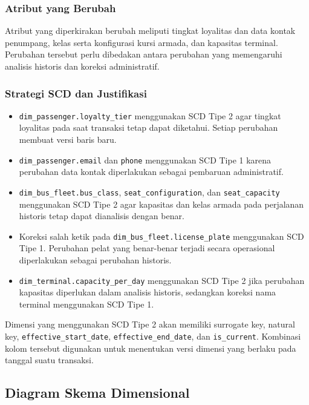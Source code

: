 \subsubsection{Atribut yang Berubah}

Atribut yang diperkirakan berubah meliputi tingkat loyalitas dan data kontak
penumpang, kelas serta konfigurasi kursi armada, dan kapasitas terminal. Perubahan
tersebut perlu dibedakan antara perubahan yang memengaruhi analisis historis dan
koreksi administratif.

\subsubsection{Strategi SCD dan Justifikasi}

\begin{itemize}[leftmargin=*, topsep=0pt]
    \item \texttt{dim\_passenger.loyalty\_tier} menggunakan SCD Tipe 2 agar tingkat
    loyalitas pada saat transaksi tetap dapat diketahui. Setiap perubahan membuat
    versi baris baru.
    \item \texttt{dim\_passenger.email} dan \texttt{phone} menggunakan SCD Tipe 1
    karena perubahan data kontak diperlakukan sebagai pembaruan administratif.
    \item \texttt{dim\_bus\_fleet.bus\_class}, \texttt{seat\_configuration}, dan
    \texttt{seat\_capacity} menggunakan SCD Tipe 2 agar kapasitas dan kelas armada
    pada perjalanan historis tetap dapat dianalisis dengan benar.
    \item Koreksi salah ketik pada \texttt{dim\_bus\_fleet.license\_plate}
    menggunakan SCD Tipe 1. Perubahan pelat yang benar-benar terjadi secara
    operasional diperlakukan sebagai perubahan historis.
    \item \texttt{dim\_terminal.capacity\_per\_day} menggunakan SCD Tipe 2 jika perubahan
    kapasitas diperlukan dalam analisis historis, sedangkan koreksi nama terminal
    menggunakan SCD Tipe 1.
\end{itemize}

Dimensi yang menggunakan SCD Tipe 2 akan memiliki surrogate key, natural key,
\texttt{effective\_start\_date}, \texttt{effective\_end\_date}, dan
\texttt{is\_current}. Kombinasi kolom tersebut digunakan untuk menentukan versi
dimensi yang berlaku pada tanggal suatu transaksi.

\subsection{Diagram Skema Dimensional}
